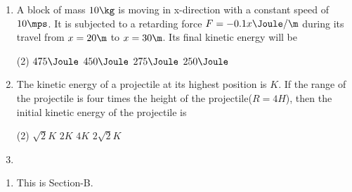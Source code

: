 \documentclass{article}
\begin{document}
\begin{enumerate}
\item A block of mass $10 \kg$ is moving in x-direction with a constant speed of $10 \mps$. It is subjected to a retarding force $F = - 0.1 x \Joule/\m$ during its travel from $x = 20 \m$ to $x = 30 \m$. Its final kinetic energy will be
\begin{tasks}(2)
	\task $475\Joule$\ans
	\task $450\Joule$
	\task $275\Joule$
	\task $250\Joule$
\end{tasks}

\item The kinetic energy of a projectile at its highest position is $K$. If the range of the projectile is four times the height of the projectile($R=4H$), then the initial kinetic energy of the projectile is
\begin{tasks}(2)
	\task $\sqrt{2}K$
	\task $2K$\ans
	\task $4K$
	\task $2\sqrt{2}K$
\end{tasks}

\item 

\end{enumerate}

\jeeSectionB
\begin{enumerate}\addtocounter{enumi}{20}
\item This is Section-B. 
\end{enumerate}
\end{document}
